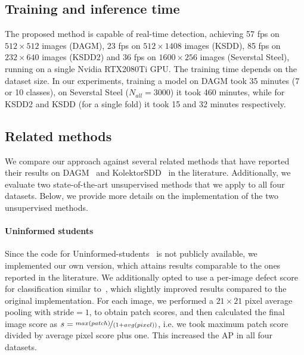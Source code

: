 \subsection{Training and inference time}
The proposed method is capable of real-time detection, achieving 57 fps on $512\times512$ images (DAGM), 23 fps on $512\times1408$ images (KSDD), 85 fps on $232\times640$ images (KSDD2) and 36 fps on $1600\times256$ images (Severstal Steel), running on a single Nvidia RTX2080Ti GPU. The training time depends on the dataset size. In our experiments, training a model on DAGM took 35 minutes (7 or 10 classes), on Severstal Steel ($N_{all}=3000$) it took 460 minutes, while for KSDD2 and KSDD (for a single fold) it took 15 and 32 minutes respectively.

\subsection{Related methods}

We compare our approach against several related methods that have reported their results on DAGM~\cite{Staar2018, CADN, Kim2017_DAGM, Racki2018, Weimer2016, Lin2020, Wang2018c, Huang2020, Liu2020a} and KolektorSDD~\cite{Dong2020, Tabernik2019JIM, Liu2020} in the literature. Additionally, we evaluate two state-of-the-art unsupervised methods that we apply to all four datasets. Below, we provide more details on the implementation of the two unsupervised methods.

\paragraph{Uninformed students}
Since the code for Uninformed-students~\cite{uninformedStudents} is not publicly available, we implemented our own version, which attains results comparable to the ones reported in the literature. We additionally opted to use a per-image defect score for classification similar to~\cite{Nguyen2019Scoring}, which slightly improved results compared to the original implementation. For each image, we performed a $21\times21$ pixel average pooling with $\text{stride}=1$, to obtain patch scores, and then calculated the final image score as $s=\nicefrac{max(patch)}{(1+avg(pixel))}$, i.e. we took maximum patch score divided by average pixel score plus one.
This increased the AP in all four datasets.

